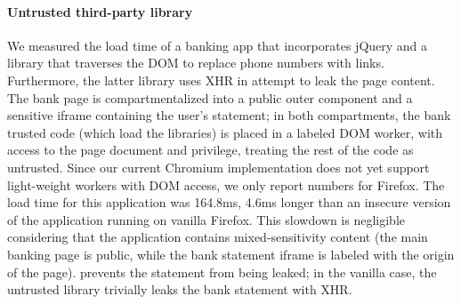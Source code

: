 \paragraph{Untrusted third-party library}

We measured the load time of a banking app that incorporates jQuery and
a library that traverses the DOM to replace phone numbers with links.
%
Furthermore, the latter library uses XHR in attempt to leak the page content.
%
The bank page is compartmentalized into a public outer component and
a sensitive iframe containing the user's statement;
in both compartments, the bank trusted code (which load the libraries)
is placed in a labeled DOM worker, with access to the page document
and privilege, treating the rest of the code as untrusted.
%
Since our current Chromium implementation does not yet support
light-weight workers with DOM access, we only report numbers for
Firefox.
%
The load time for this application was 164.8ms, 4.6ms longer than an
insecure version of the application running on vanilla Firefox.
%
%
This slowdown is negligible considering that the
application contains mixed-sensitivity content (the main banking page
is public, while the bank statement iframe is labeled with the origin
of the page). \sys{} prevents the statement from being leaked; in the vanilla
case, the untrusted library trivially leaks the bank statement with
XHR\@.





